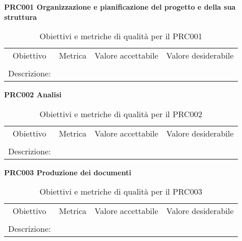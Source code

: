 \documentclass[../piano-di-qualifica.tex]{subfiles}
\begin{document}
\begin{center}
    \centering
    \textbf{PRC001 Organizzazione e pianificazione del progetto e della sua struttura}
\end{center}
    \begin{table}[H]
        \centering
        \begin{tabular}{cccc}
        Obiettivo    & Metrica & Valore accettabile & Valore desiderabile \\
                     &         &                    &                    \\
        Descrizione: & \multicolumn{3}{c}{}        
        \end{tabular}
        \caption{Obiettivi e metriche di qualità per il PRC001}
    \end{table}

    \begin{center}
        \centering
        \textbf{PRC002 Analisi}
    \end{center}
        \begin{table}[H]
            \centering
            \begin{tabular}{cccc}
            Obiettivo    & Metrica & Valore accettabile & Valore desiderabile \\
                         &         &                    &                    \\
            Descrizione: & \multicolumn{3}{c}{}        
            \end{tabular}
            \caption{Obiettivi e metriche di qualità per il PRC002}
        \end{table}

        \begin{center}
            \centering
            \textbf{PRC003 Produzione dei documenti}
        \end{center}
            \begin{table}[H]
                \centering
                \begin{tabular}{cccc}
                Obiettivo    & Metrica & Valore accettabile & Valore desiderabile \\
                             &         &                    &                    \\
                Descrizione: & \multicolumn{3}{c}{}        
                \end{tabular}
                \caption{Obiettivi e metriche di qualità per il PRC003}
            \end{table}
\end{document}
